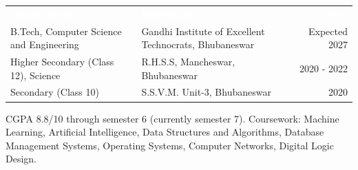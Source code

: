 
\vspace{2pt}
\begin{tabularx}{\textwidth}{>{\raggedright\arraybackslash}p{5.6cm}Xr}
\rowcolor{navy}
\textcolor{white}{\textbf{Qualification}} & \textcolor{white}{\textbf{Institution}} & \textcolor{white}{\textbf{Year}} \\
B.Tech, Computer Science and Engineering & Gandhi Institute of Excellent Technocrats, Bhubaneswar & Expected 2027 \\
Higher Secondary (Class 12), Science & R.H.S.S, Mancheswar, Bhubaneswar & 2020 - 2022 \\
Secondary (Class 10) & S.S.V.M. Unit-3, Bhubaneswar & 2020 \\
\end{tabularx}

\vspace{4pt}

CGPA 8.8/10 through semester 6 (currently semester 7). Coursework: Machine Learning, Artificial Intelligence, Data Structures and Algorithms, Database Management Systems, Operating Systems, Computer Networks, Digital Logic Design.
